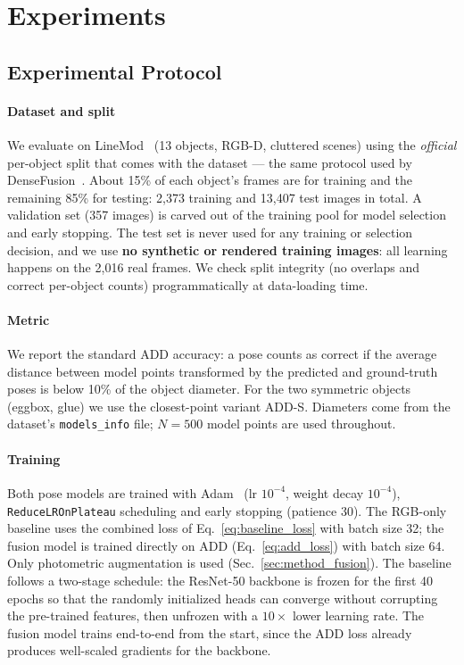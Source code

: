 \section{Experiments}
\label{sec:exp}

\subsection{Experimental Protocol}
\label{sec:exp_protocol}

\paragraph{Dataset and split}
We evaluate on LineMod~\cite{hinterstoisser2012model} (13 objects, RGB-D, cluttered scenes) using the \emph{official} per-object split that comes with the dataset --- the same protocol used by DenseFusion~\cite{wang2019densefusion}. About 15\% of each object's frames are for training and the remaining 85\% for testing: 2{,}373 training and 13{,}407 test images in total. A validation set (357 images) is carved out of the training pool for model selection and early stopping. The test set is never used for any training or selection decision, and we use \textbf{no synthetic or rendered training images}: all learning happens on the 2{,}016 real frames. We check split integrity (no overlaps and correct per-object counts) programmatically at data-loading time.

\paragraph{Metric}
We report the standard ADD accuracy: a pose counts as correct if the average distance between model points transformed by the predicted and ground-truth poses is below 10\% of the object diameter. For the two symmetric objects (eggbox, glue) we use the closest-point variant ADD-S. Diameters come from the dataset's \texttt{models\_info} file; $N{=}500$ model points are used throughout.

\paragraph{Training}
Both pose models are trained with Adam~\cite{kingma2014adam} (lr $10^{-4}$, weight decay $10^{-4}$), \texttt{ReduceLROnPlateau} scheduling and early stopping (patience 30). The RGB-only baseline uses the combined loss of Eq.~\ref{eq:baseline_loss} with batch size 32; the fusion model is trained directly on ADD (Eq.~\ref{eq:add_loss}) with batch size 64. Only photometric augmentation is used (Sec.~\ref{sec:method_fusion}). The baseline follows a two-stage schedule: the ResNet-50 backbone is frozen for the first 40 epochs so that the randomly initialized heads can converge without corrupting the pre-trained features, then unfrozen with a $10\times$ lower learning rate. The fusion model trains end-to-end from the start, since the ADD loss already produces well-scaled gradients for the backbone.

